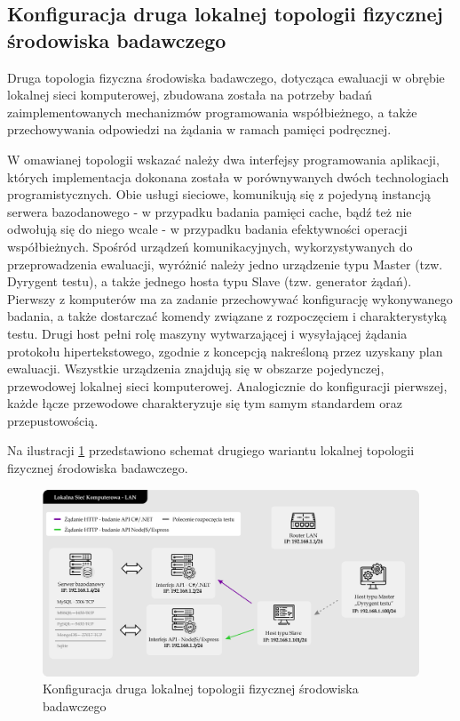 \subsection*{Konfiguracja druga lokalnej topologii fizycznej środowiska badawczego}
\label{sec:lokalne-srodowisko-badawcze-ver-2}
Druga topologia fizyczna środowiska badawczego, dotycząca ewaluacji w obrębie lokalnej sieci komputerowej, zbudowana została na potrzeby badań zaimplementowanych mechanizmów programowania współbieżnego, a także przechowywania odpowiedzi na żądania w ramach pamięci podręcznej.

W omawianej topologii wskazać należy dwa interfejsy programowania aplikacji, których implementacja dokonana została w porównywanych dwóch technologiach programistycznych. Obie usługi sieciowe, komunikują się z pojedyną instancją serwera bazodanowego - w przypadku badania pamięci cache, bądź też nie odwołują się do niego wcale - w przypadku badania efektywności operacji współbieżnych. Spośród urządzeń komunikacyjnych, wykorzystywanych do przeprowadzenia ewaluacji, wyróżnić należy jedno urządzenie typu Master (tzw. Dyrygent testu), a także jednego hosta typu Slave (tzw. generator żądań). Pierwszy z komputerów ma za zadanie przechowywać konfigurację wykonywanego badania, a także dostarczać komendy związane z rozpoczęciem i charakterystyką testu. Drugi host pełni rolę maszyny wytwarzającej i wysyłającej żądania protokołu hipertekstowego, zgodnie z koncepcją nakreśloną przez uzyskany plan ewaluacji. Wszystkie urządzenia znajdują się w obszarze pojedynczej, przewodowej lokalnej sieci komputerowej. Analogicznie do konfiguracji pierwszej, każde łącze przewodowe charakteryzuje się tym samym standardem oraz przepustowością.

Na ilustracji \ref{fig:topologia-2} przedstawiono schemat drugiego wariantu lokalnej topologii fizycznej środowiska badawczego.

\begin{figure}[ht]
    \centering
     \includegraphics[width=\linewidth]{rys04/topologia-2.png}
    \caption{Konfiguracja druga lokalnej topologii fizycznej środowiska badawczego}
    \label{fig:topologia-2}
\end{figure}

